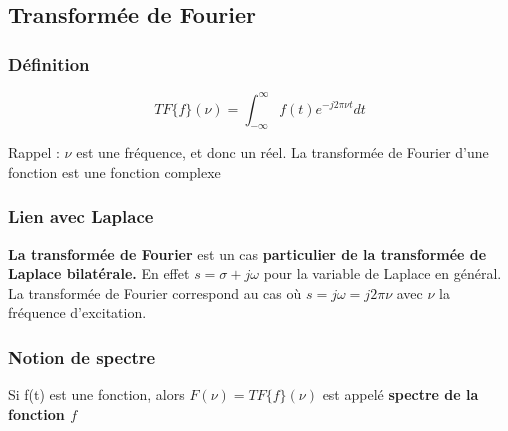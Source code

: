\documentclass[11pt,a4paper]{article}
\begin{document}
\subsection*{Transformée de Fourier}
\subsubsection*{Définition}
\[TF\{ f \}(\nu) = \displaystyle \int^{\infty}_{-\infty} f(t) e^{-j2\pi \nu t} dt\]

Rappel :  $\nu$ est une fréquence, et donc un réel. La transformée de Fourier d'une fonction est une fonction complexe

\subsubsection*{Lien avec Laplace}
\textbf{La transformée de Fourier} est un cas \textbf{particulier de la transformée de Laplace bilatérale.} En effet $s= \sigma + j \omega$ pour la variable de Laplace en général. La transformée de Fourier correspond au cas où $s = j \omega = j 2 \pi \nu$ avec $\nu$ la fréquence d'excitation.

\subsubsection*{Notion de spectre}
Si f(t) est une fonction, alors $F(\nu) = TF\{f\}(\nu)$ est appelé \textbf{spectre de la fonction $f$}
\end{document}
